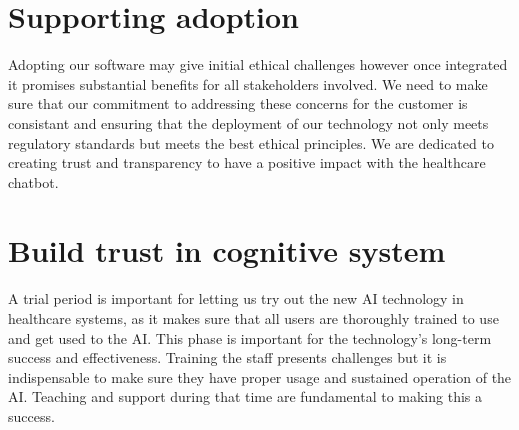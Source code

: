 \documentclass{article}
\begin{document}
\section{Supporting adoption}
Adopting our software may give initial ethical  challenges however once integrated it promises substantial benefits for all stakeholders involved. We need to make sure that our commitment to addressing these concerns for the customer is consistant and ensuring that the deployment of our technology not only meets regulatory standards but meets the best ethical principles. We are dedicated to creating trust and transparency to have a positive impact with the healthcare chatbot.


\section{Build trust in cognitive system}
A trial period is important for letting us try out the new AI technology in healthcare systems, as it makes sure that all users are thoroughly trained to use and get used to the AI. This  phase is important for the technology's long-term success and effectiveness. Training the staff presents challenges but it is indispensable to make sure they have proper usage and sustained operation of the AI. Teaching and support during that time are fundamental to making this a success.
\end{document}
